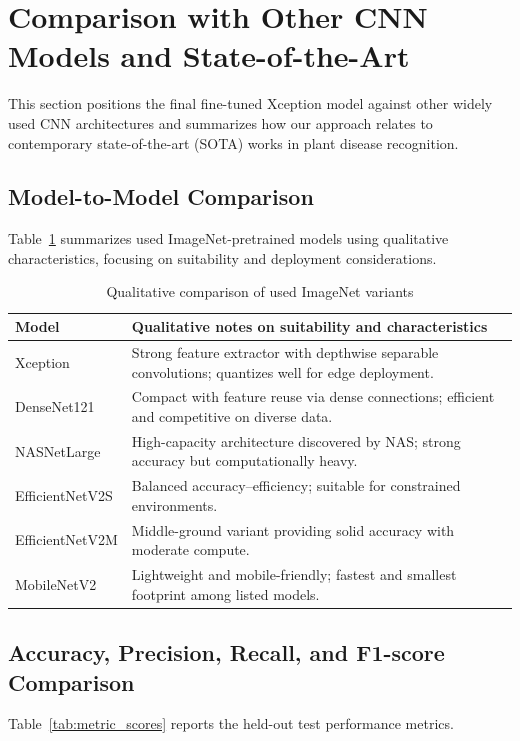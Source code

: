 \documentclass[12pt, a4paper]{report}
\begin{document}
\section{Comparison with Other CNN Models and State-of-the-Art}
\label{sec:cnn_comparison}
\noindent
\justifying
This section positions the final fine-tuned Xception model against other widely used CNN architectures and summarizes how our approach relates to contemporary state-of-the-art (SOTA) works in plant disease recognition.

\subsection*{Model-to-Model Comparison} %
\noindent
Table~\ref{tab:model_comparison} summarizes used ImageNet-pretrained models using qualitative characteristics, focusing on suitability and deployment considerations.

\begin{table}[H]
    \centering
    \renewcommand{\arraystretch}{1.15}
    \begin{tabular}{|l|p{11cm}|}
        \hline
        \textbf{Model} & \textbf{Qualitative notes on suitability and characteristics} \\
        \hline
        Xception & Strong feature extractor with depthwise separable convolutions; quantizes well for edge deployment. \\
        DenseNet121 & Compact with feature reuse via dense connections; efficient and competitive on diverse data. \\
        NASNetLarge & High-capacity architecture discovered by NAS; strong accuracy but computationally heavy. \\
        EfficientNetV2S & Balanced accuracy–efficiency; suitable for constrained environments. \\
        EfficientNetV2M & Middle-ground variant providing solid accuracy with moderate compute. \\
        MobileNetV2 & Lightweight and mobile-friendly; fastest and smallest footprint among listed models. \\
        \hline
    \end{tabular}
    \caption{Qualitative comparison of used ImageNet variants}
    \label{tab:model_comparison}
\end{table}

\subsection*{Accuracy, Precision, Recall, and F1-score Comparison}
\noindent
Table~\ref{tab:metric_scores} reports the held-out test performance metrics.
\end{document}
